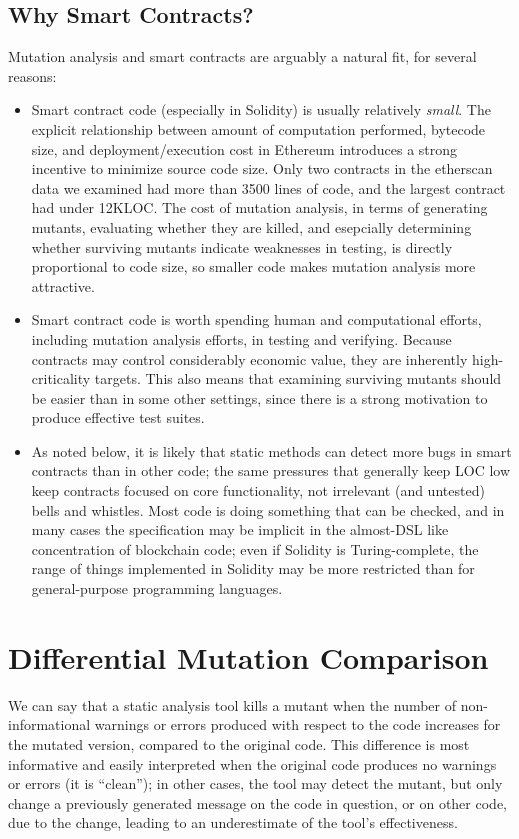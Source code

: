 \documentclass{article}
\begin{document}
\subsection{Why Smart Contracts?}

Mutation analysis and smart contracts are arguably a natural fit, for several reasons:

\begin{itemize}
\item Smart contract code (especially in Solidity) is usually relatively \emph{small}.  The explicit relationship between amount of computation performed, bytecode size, and deployment/execution cost in Ethereum introduces a strong incentive to minimize source code size.  Only two contracts in the etherscan data we examined had more than 3500 lines of code, and the largest contract had under 12KLOC.  The cost of mutation analysis, in terms of generating mutants, evaluating whether they are killed, and esepcially determining whether surviving mutants indicate weaknesses in testing, is directly proportional to code size, so smaller code makes mutation analysis more attractive.
\item Smart contract code is worth spending human and computational efforts, including mutation analysis efforts, in testing and verifying.  Because contracts may control considerably economic value, they are inherently high-criticality targets.  This also means that examining surviving mutants should be easier than in some other settings, since there is a strong motivation to produce effective test suites.
\item As noted below, it is likely that static methods can detect more bugs in smart contracts than in other code; the same pressures that generally keep LOC low keep contracts focused on core functionality, not irrelevant (and untested) bells and whistles.  Most code is doing something that can be checked, and in many cases the specification may be implicit in the almost-DSL like concentration of blockchain code; even if Solidity is Turing-complete, the range of things implemented in Solidity may be more restricted than for general-purpose programming languages.
\end{itemize}

\section{Differential Mutation Comparison}

We can say that a static analysis tool kills a mutant when the number of non-informational warnings or errors produced with respect to the code increases for the mutated version, compared to the original code.  This difference is most informative and easily interpreted when the original code produces no warnings or errors (it is ``clean''); in other cases, the tool may detect the mutant, but only change a previously generated message on the code in question, or on other code, due to the change, leading to an underestimate of the tool's effectiveness.
\end{document}
